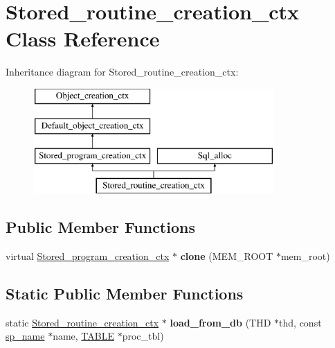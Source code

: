 \hypertarget{classStored__routine__creation__ctx}{}\section{Stored\+\_\+routine\+\_\+creation\+\_\+ctx Class Reference}
\label{classStored__routine__creation__ctx}
Inheritance diagram for Stored\+\_\+routine\+\_\+creation\+\_\+ctx\+:\begin{figure}[H]
\begin{center}
\leavevmode
\includegraphics[height=4.000000cm]{classStored__routine__creation__ctx}
\end{center}
\end{figure}
\subsection*{Public Member Functions}
\begin{DoxyCompactItemize}
\item 
\mbox{\label{classStored__routine__creation__ctx_a5cd95f9f8240de147de6c1e8c7af700a}} 
virtual \mbox{\hyperlink{classStored__program__creation__ctx}{Stored\+\_\+program\+\_\+creation\+\_\+ctx}} $\ast$ {\bfseries clone} (M\+E\+M\+\_\+\+R\+O\+OT $\ast$mem\+\_\+root)
\end{DoxyCompactItemize}
\subsection*{Static Public Member Functions}
\begin{DoxyCompactItemize}
\item 
\mbox{\label{classStored__routine__creation__ctx_a3bdc1e88e8731db66c11a0cf32500e53}} 
static \mbox{\hyperlink{classStored__routine__creation__ctx}{Stored\+\_\+routine\+\_\+creation\+\_\+ctx}} $\ast$ {\bfseries load\+\_\+from\+\_\+db} (T\+HD $\ast$thd, const \mbox{\hyperlink{classsp__name}{sp\+\_\+name}} $\ast$name, \mbox{\hyperlink{structTABLE}{T\+A\+B\+LE}} $\ast$proc\+\_\+tbl)
\end{DoxyCompactItemize}
